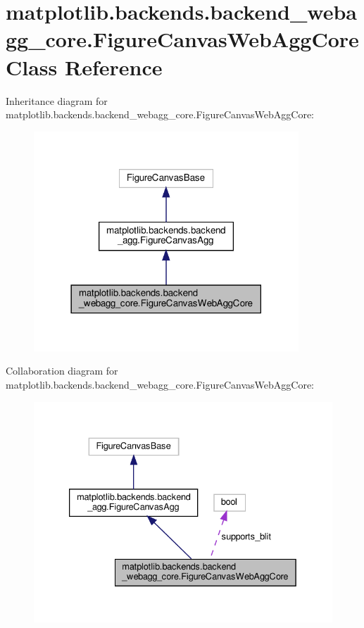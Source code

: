 \hypertarget{classmatplotlib_1_1backends_1_1backend__webagg__core_1_1FigureCanvasWebAggCore}{}\section{matplotlib.\+backends.\+backend\+\_\+webagg\+\_\+core.\+Figure\+Canvas\+Web\+Agg\+Core Class Reference}
\label{classmatplotlib_1_1backends_1_1backend__webagg__core_1_1FigureCanvasWebAggCore}


Inheritance diagram for matplotlib.\+backends.\+backend\+\_\+webagg\+\_\+core.\+Figure\+Canvas\+Web\+Agg\+Core\+:
\nopagebreak
\begin{figure}[H]
\begin{center}
\leavevmode
\includegraphics[width=282pt]{classmatplotlib_1_1backends_1_1backend__webagg__core_1_1FigureCanvasWebAggCore__inherit__graph}
\end{center}
\end{figure}


Collaboration diagram for matplotlib.\+backends.\+backend\+\_\+webagg\+\_\+core.\+Figure\+Canvas\+Web\+Agg\+Core\+:
\nopagebreak
\begin{figure}[H]
\begin{center}
\leavevmode
\includegraphics[width=333pt]{classmatplotlib_1_1backends_1_1backend__webagg__core_1_1FigureCanvasWebAggCore__coll__graph}
\end{center}
\end{figure}
